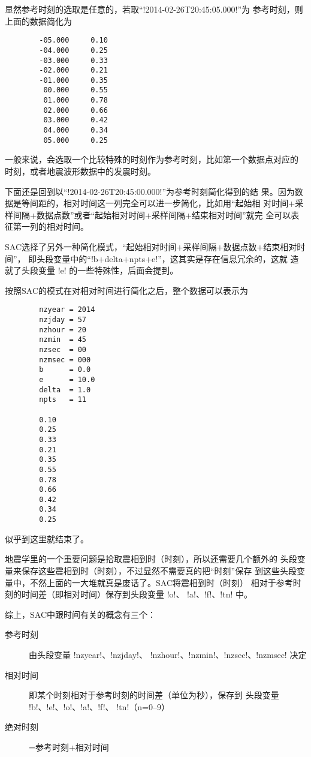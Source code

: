 显然参考时刻的选取是任意的，若取``!2014-02-26T20:45:05.000!''为
参考时刻，则上面的数据简化为
\begin{verbatim}
        -05.000     0.10
        -04.000     0.25
        -03.000     0.33
        -02.000     0.21
        -01.000     0.35
         00.000     0.55
         01.000     0.78
         02.000     0.66
         03.000     0.42
         04.000     0.34
         05.000     0.25
\end{verbatim}

一般来说，会选取一个比较特殊的时刻作为参考时刻，比如第一个数据点对应的
时刻，或者地震波形数据中的发震时刻。

下面还是回到以``!2014-02-26T20:45:00.000!''为参考时刻简化得到的结
果。因为数据是等间距的，相对时间这一列完全可以进一步简化，比如用``起始相
对时间+采样间隔+数据点数''或者``起始相对时间+采样间隔+结束相对时间''就完
全可以表征第一列的相对时间。

SAC选择了另外一种简化模式，``起始相对时间+采样间隔+数据点数+结束相对时间''，
即头段变量中的``!b+delta+npts+e!''，这其实是存在信息冗余的，这就
造就了头段变量 !e! 的一些特殊性，后面会提到。

按照SAC的模式在对相对时间进行简化之后，整个数据可以表示为
\begin{verbatim}
        nzyear = 2014
        nzjday = 57
        nzhour = 20
        nzmin  = 45
        nzsec  = 00
        nzmsec = 000
        b      = 0.0
        e      = 10.0
        delta  = 1.0
        npts   = 11

        0.10
        0.25
        0.33
        0.21
        0.35
        0.55
        0.78
        0.66
        0.42
        0.34
        0.25
\end{verbatim}
似乎到这里就结束了。

地震学里的一个重要问题是拾取震相到时（时刻），所以还需要几个额外的
头段变量来保存这些震相到时（时刻），不过显然不需要真的把``时刻''保存
到这些头段变量中，不然上面的一大堆就真是废话了。SAC将震相到时（时刻）
相对于参考时刻的时间差（即相对时间）保存到头段变量 !o!、
!a!、!f!、!tn! 中。

综上，SAC中跟时间有关的概念有三个：
\begin{description}
\item [参考时刻] 由头段变量 !nzyear!、!nzjday!、
    !nzhour!、!nzmin!、!nzsec!、!nzmsec! 决定
\item [相对时间] 即某个时刻相对于参考时刻的时间差（单位为秒），保存到
    头段变量 !b!、!e!、!o!、!a!、!f!、
    !tn!（n=0--9）
\item [绝对时刻] =参考时刻+相对时间
\end{description}

